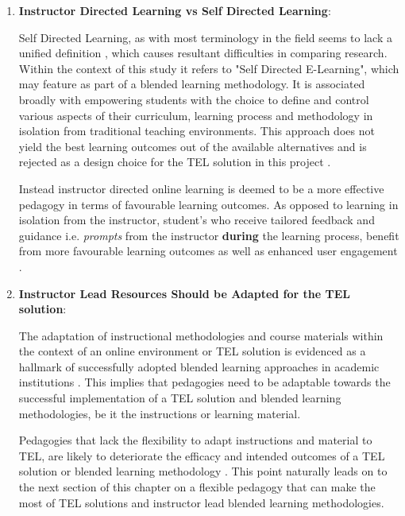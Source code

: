 \begin{enumerate}

    \item \textbf{Instructor Directed Learning vs Self Directed Learning}:
    
    Self Directed Learning, as with most terminology in  the field seems to lack a unified definition \cite{OShea2003,Hiemstra2006}, which causes resultant difficulties in comparing research. Within the context of this study it refers to "Self Directed E-Learning", which may feature as part of a blended learning methodology. It is associated broadly with empowering students with the choice to define and control various aspects of their curriculum, learning process and methodology in isolation \cite{Hiemstra2006,Means2009,RickReis,Team2008} from traditional teaching environments. This approach does not yield the best learning outcomes out of the available alternatives and is rejected as a design choice for the TEL solution in this project \cite{RickReis,Team2008}. 
    
    Instead instructor directed online learning is deemed to be a more effective pedagogy in terms of favourable learning outcomes. As opposed to learning in isolation from the instructor, student's who receive tailored feedback and guidance  i.e. \textit{prompts} from the instructor \textbf{during} the learning process, benefit from more favourable learning outcomes as well as enhanced user engagement \cite{RickReis,Team2008,Means2009}.

\newpage

    \item \textbf{Instructor Lead Resources Should be Adapted for the TEL solution}:
    
    The adaptation of instructional methodologies and course materials within the context of an online environment or TEL solution is evidenced as a hallmark of successfully adopted blended learning approaches in academic institutions \cite{Means2009,Team2008,RickReis}. This implies that pedagogies need to be adaptable towards the successful implementation of a TEL solution and blended learning methodologies, be it the instructions or learning material.
    
    Pedagogies that lack the flexibility to adapt instructions and material to TEL, are likely to deteriorate the efficacy and intended outcomes of a TEL solution or blended learning methodology \cite{RickReis,Team2008,Means2009}. This point naturally leads on to the next section of this chapter on a flexible pedagogy that can make the most of TEL solutions and instructor lead blended learning methodologies.
\end{enumerate}



